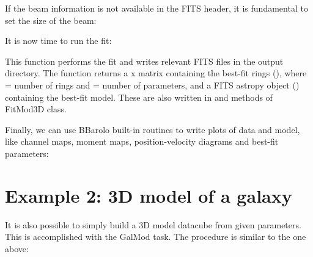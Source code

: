 \documentclass[letterpaper,10pt,english]{sphinxmanual}
\begin{document}
If the beam information is not available in the FITS header, it is fundamental to set the size of the beam:

\begin{sphinxVerbatim}[commandchars=\\\{\}]
\end{sphinxVerbatim}

It is now time to run the fit:

\begin{sphinxVerbatim}[commandchars=\\\{\}]
   
\end{sphinxVerbatim}

This function performs the fit and writes relevant FITS files in the output directory. The function returns a  x  matrix containing the best-fit rings (), where  = number of rings and  = number of parameters, and a FITS astropy object () containing the best-fit model. These are also written in  and  methods of FitMod3D class.

Finally, we can use BBarolo built-in routines to write plots of data and model, like channel maps, moment maps, position-velocity diagrams and best-fit parameters:

\begin{sphinxVerbatim}[commandchars=\\\{\}]
\end{sphinxVerbatim}


\section{Example 2: 3D model of a galaxy}
\label{\detokenize{pybb_quickstart:example-2-3d-model-of-a-galaxy}}
It is also possible to simply build a 3D model datacube from given parameters. This is accomplished with the GalMod task. The procedure is similar to the one above:
\end{document}
